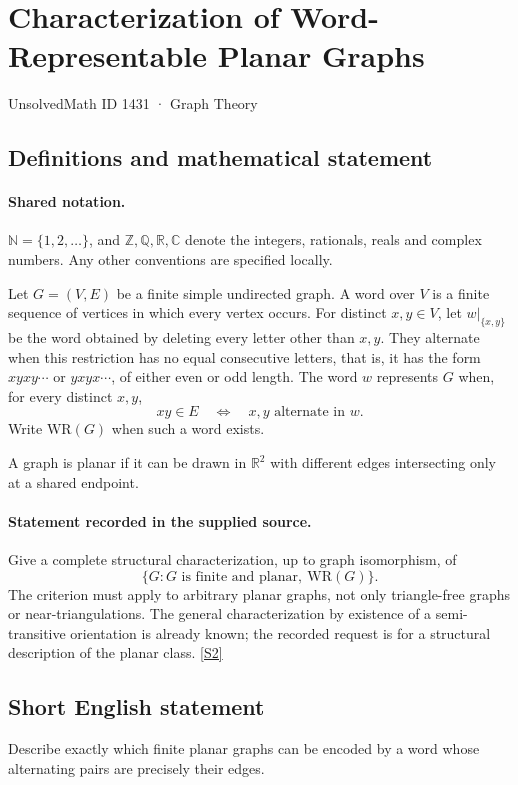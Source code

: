 \documentclass[11pt]{article}
\newcommand{\sref}[2]{\hyperlink{source:#1:#2}{[S#2]}}
\begin{document}
\setcounter{section}{1430}
\section{Characterization of Word-Representable Planar Graphs}\label{1431}
{\small\sffamily UnsolvedMath ID 1431 · Graph Theory}
\subsection{Definitions and mathematical statement}

\paragraph{Shared notation.}$\mathbb N=\{1,2,\ldots\}$, and $\mathbb Z,\mathbb Q,\mathbb R,\mathbb C$ denote the integers, rationals, reals and complex numbers. Any other conventions are specified locally.


Let $G=(V,E)$ be a finite simple undirected graph. A word over $V$ is a finite sequence of vertices in which every vertex occurs. For distinct $x,y\in V$, let $w|_{\{x,y\}}$ be the word obtained by deleting every letter other than $x,y$. They alternate when this restriction has no equal consecutive letters, that is, it has the form $xyxy\cdots$ or $yxyx\cdots$, of either even or odd length. The word $w$ represents $G$ when, for every distinct $x,y$,
\[
 xy\in E\quad\Longleftrightarrow\quad x,y\text{ alternate in }w.
\]
Write $\mathrm{WR}(G)$ when such a word exists.

A graph is planar if it can be drawn in $\mathbb R^2$ with different edges intersecting only at a shared endpoint.
\paragraph{Statement recorded in the supplied source.}
Give a complete structural characterization, up to graph isomorphism, of
\[
 \{G:G\text{ is finite and planar},\ \mathrm{WR}(G)\}.
\]
The criterion must apply to arbitrary planar graphs, not only triangle-free graphs or near-triangulations. The general characterization by existence of a semi-transitive orientation is already known; the recorded request is for a structural description of the planar class. \sref{1431}{2}
\subsection{Short English statement}
Describe exactly which finite planar graphs can be encoded by a word whose alternating pairs are precisely their edges.
\end{document}
